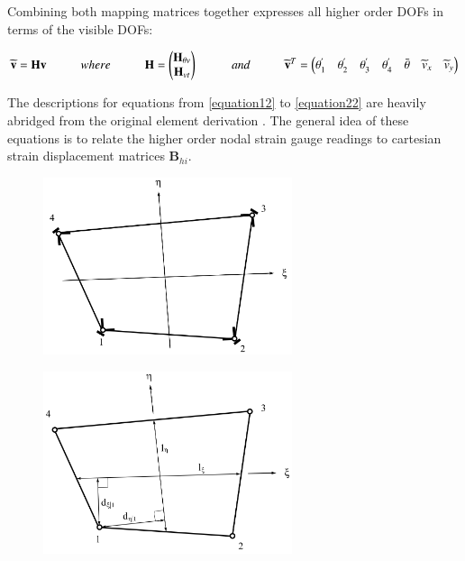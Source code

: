 Combining both mapping matrices together expresses all higher order DOFs in terms of the visible DOFs:

\begin{equation} 
\widetilde{\mathbf{v}} = \mathbf{H v}
\hspace{10mm}
where
\hspace{10mm}
\mathbf{H} =
\begin{pmatrix}
\mathbf{H}_{\theta v} \\
\mathbf{H}_{vt}
\end{pmatrix}
\hspace{10mm}
and
\hspace{10mm}
\widetilde{\mathbf{v}}^T = 
\begin{pmatrix}
\theta_1^{'} & \theta_2^{'} & \theta_3^{'} & \theta_4^{'} & \bar{\theta} &  \widetilde{v}_x & \widetilde{v}_y
\end{pmatrix}
\label{equation11}
\end{equation}

The descriptions for equations from \eqref{equation12} to \eqref{equation22} are heavily abridged from the original element derivation \cite{Hau94}. The general idea of these equations is to relate the higher order nodal strain gauge readings to cartesian strain displacement matrices $\mathbf{B}_{hi}$.

\begin{figure}[H]
	\begin{minipage}{.5\textwidth}
		\centering
		\includegraphics[width=7.3cm]
		{images/ANDES_strain_gauges.png}
		\label{fig:andes_gauges}
	\end{minipage}%
	\begin{minipage}{.5\textwidth}
		\centering
		\includegraphics[width=7.3cm]
		{images/andes_geometric_quantities.png}
		\label{fig:andes_dims}
	\end{minipage}
\end{figure}

